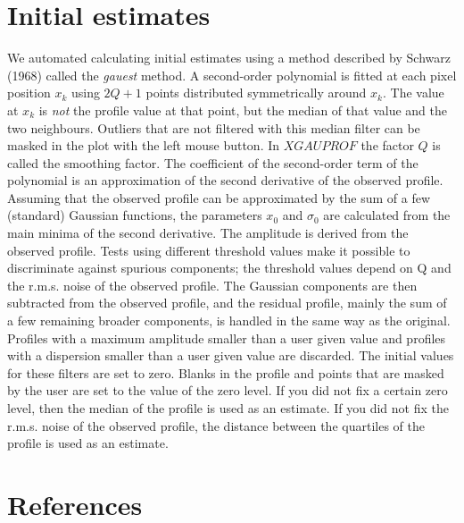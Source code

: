 \documentclass[10pt,a4paper]{report}
\begin{document}
\begin{flushleft}
\chapter{Initial estimates}

We automated calculating initial estimates using a method described by 
Schwarz (1968) called the {\it gauest} method. A second-order polynomial is 
fitted at each pixel  position $x_k$ using $2Q+1$ points distributed 
symmetrically around $x_k$. 
The value at $x_k$ is {\it not} the profile value at that point, but
the median of that value and the two neighbours. Outliers that are not 
filtered with this median filter can be masked in the plot with the 
left mouse button. 
In $XGAUPROF$ the factor $Q$ is called the smoothing factor.
The coefficient of the second-order term of the polynomial is an
approximation of the second derivative of the observed profile. Assuming
that the observed profile can be approximated by the sum of a few (standard)
Gaussian functions, the parameters $x_0$ and $\sigma_0$ are calculated
from the main minima of the second derivative. The amplitude is derived
from the observed profile. Tests using different threshold values make
it possible to discriminate against spurious components; the threshold values 
depend on Q and the r.m.s. noise of the observed profile. The Gaussian
components are then subtracted from the observed profile, and the residual 
profile, mainly the sum of a few remaining broader components, is handled 
in the same way as the original.
Profiles with a maximum amplitude smaller than a user given value and
profiles with a dispersion smaller than a user given value are discarded.
The initial values for these filters are set to zero.
Blanks in the profile and points that are masked by the user are set to 
the value of the zero level. If you did not fix a certain zero level, then
the median of the profile is used as an estimate. If you did not fix
the r.m.s. noise of the observed profile, the distance between the quartiles
of the profile is used as an estimate.
\chapter{References}



\end{flushleft}
\end{document}
